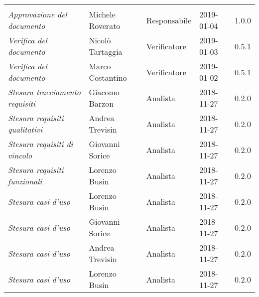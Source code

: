 \newpage 
\section*{}
\begin{table}[H]
	\centering
	\begin{tabular}{p{4cm}|C{3cm}|C{3cm}|R{2.5cm}|R{2cm}}
		
		 & & & & \\
		
		
		\emph{Approvazione del documento} & Michele Roverato & Responsabile & 2019-01-04 & 1.0.0 \\
		\hline
		
		\emph{Verifica del documento} & Nicolò Tartaggia & Verificatore & 2019-01-03 & 0.5.1 \\
		\hline
		
		\emph{Verifica del documento} & Marco Costantino & Verificatore & 2019-01-02 & 0.5.1 \\
		\hline
		
		\emph{Stesura tracciamento requisiti} & Giacomo Barzon & Analista & 2018-11-27 & 0.2.0 \\
		\hline
		
		\emph{Stesura requisiti qualitativi} & Andrea Trevisin & Analista & 2018-11-27 & 0.2.0 \\
		\hline
		
		\emph{Stesura requisiti di vincolo} & Giovanni Sorice & Analista & 2018-11-27 & 0.2.0 \\
		\hline
		
		\emph{Stesura requisiti funzionali} & Lorenzo Busin & Analista & 2018-11-27 & 0.2.0 \\
		\hline
		
		\emph{Stesura casi d'uso} & Lorenzo Busin & Analista & 2018-11-27 & 0.2.0 \\
		\hline
		
		\emph{Stesura casi d'uso} & Giovanni Sorice & Analista & 2018-11-27 & 0.2.0 \\
		\hline
		
		\emph{Stesura casi d'uso} & Andrea Trevisin & Analista & 2018-11-27 & 0.2.0 \\
		\hline
		
		\emph{Stesura casi d'uso} & Lorenzo Busin & Analista & 2018-11-27 & 0.2.0 \\
		\hline
		

\end{tabular}
\end{table}
